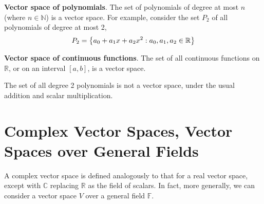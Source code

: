 \documentclass[letterpaper,12pt]{article}
\begin{document}
\begin{example}
\textbf{Vector space of polynomials}. The set of polynomials of degree at most $n$ (where $n \in \mathbb{N}$) is a vector space. For example, consider the set $P_2$ of all polynomials of degree at most 2,
\begin{equation*}
    P_2 = \left\{ a_0 + a_1 x + a_2 x^2: a_0, a_1, a_2 \in \mathbb{R} \right\}
\end{equation*}
\end{example}

\begin{example}
\textbf{Vector space of continuous functions}. The set of all continuous functions on $\mathbb{R}$, or on an interval $[a,b]$, is a vector space.
\end{example}

\begin{example}
The set of all degree 2 polynomials is not a vector space, under the usual addition and scalar multiplication.
\end{example}


\section*{Complex Vector Spaces, Vector Spaces over General Fields}
A complex vector space is defined analogously to that for a real vector space, except with $\mathbb{C}$ replacing $\mathbb{R}$ as the field of scalars. In fact, more generally, we can consider a vector space $V$ over a general field $\mathbb{F}$.
\end{document}
